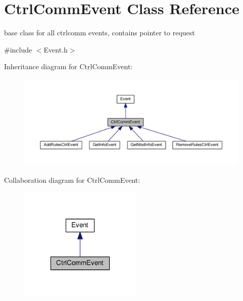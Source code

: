 \hypertarget{classCtrlCommEvent}{}\section{Ctrl\+Comm\+Event Class Reference}
\label{classCtrlCommEvent}


base class for all ctrlcomm events, contains pointer to request  




{\ttfamily \#include $<$Event.\+h$>$}



Inheritance diagram for Ctrl\+Comm\+Event\+:
\nopagebreak
\begin{figure}[H]
\begin{center}
\leavevmode
\includegraphics[width=350pt]{classCtrlCommEvent__inherit__graph}
\end{center}
\end{figure}


Collaboration diagram for Ctrl\+Comm\+Event\+:
\nopagebreak
\begin{figure}[H]
\begin{center}
\leavevmode
\includegraphics[width=166pt]{classCtrlCommEvent__coll__graph}
\end{center}
\end{figure}
